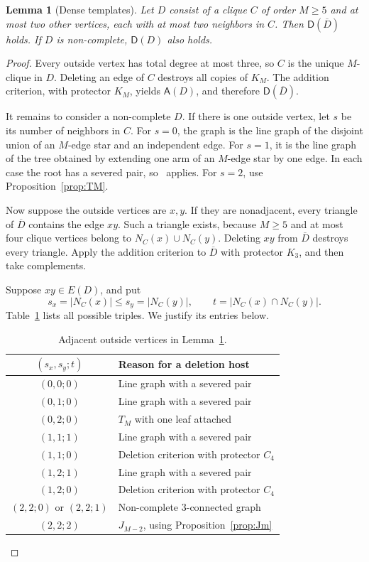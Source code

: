 \documentclass[11pt,reqno]{amsart}
\newtheorem{lemma}[theorem]{Lemma}
\theoremstyle{definition}
\theoremstyle{remark}
\newcommand{\comp}[1]{\overline{#1}}
\newcommand{\Dsat}{\mathsf{D}}
\newcommand{\Asat}{\mathsf{A}}
\begin{document}
\begin{lemma}[Dense templates]\label{lem:dense}
Let $D$ consist of a clique $C$ of order $M\ge5$ and at most two other vertices, each with at most two neighbors in $C$. Then $\Dsat(\comp D)$ holds. If $D$ is non-complete, $\Dsat(D)$ also holds.
\end{lemma}
\begin{proof}
Every outside vertex has total degree at most three, so $C$ is the unique $M$-clique in $D$. Deleting an edge of $C$ destroys all copies of $K_M$. The addition criterion, with protector $K_M$, yields $\Asat(D)$, and therefore $\Dsat(\comp D)$.

It remains to consider a non-complete $D$. If there is one outside vertex, let $s$ be its number of neighbors in $C$. For $s=0$, the graph is the line graph of the disjoint union of an $M$-edge star and an independent edge. For $s=1$, it is the line graph of the tree obtained by extending one arm of an $M$-edge star by one edge. In each case the root has a severed pair, so~\cite[Theorem~5.2]{FHHS} applies. For $s=2$, use Proposition~\ref{prop:TM}.

Now suppose the outside vertices are $x,y$. If they are nonadjacent, every triangle of $\comp D$ contains the edge $xy$. Such a triangle exists, because $M\ge5$ and at most four clique vertices belong to $N_C(x)\cup N_C(y)$. Deleting $xy$ from $\comp D$ destroys every triangle. Apply the addition criterion to $\comp D$ with protector $K_3$, and then take complements.

Suppose $xy\in E(D)$, and put
\[
 s_x=|N_C(x)|\le s_y=|N_C(y)|,\qquad
 t=|N_C(x)\cap N_C(y)|.
\]
Table~\ref{tab:dense} lists all possible triples. We justify its entries below.

\begin{table}[htbp]
\centering
\caption{Adjacent outside vertices in Lemma~\ref{lem:dense}.}\label{tab:dense}
\begin{tabular}{@{}cl@{}}\toprule
$(s_x,s_y;t)$ & Reason for a deletion host\\\midrule
$(0,0;0)$ & Line graph with a severed pair\\
$(0,1;0)$ & Line graph with a severed pair\\
$(0,2;0)$ & $T_M$ with one leaf attached\\
$(1,1;1)$ & Line graph with a severed pair\\
$(1,1;0)$ & Deletion criterion with protector $C_4$\\
$(1,2;1)$ & Line graph with a severed pair\\
$(1,2;0)$ & Deletion criterion with protector $C_4$\\
$(2,2;0)$ or $(2,2;1)$ & Non-complete $3$-connected graph\\
$(2,2;2)$ & $J_{M-2}$, using Proposition~\ref{prop:Jm}\\\bottomrule
\end{tabular}
\end{table}


\end{proof}
\end{document}
